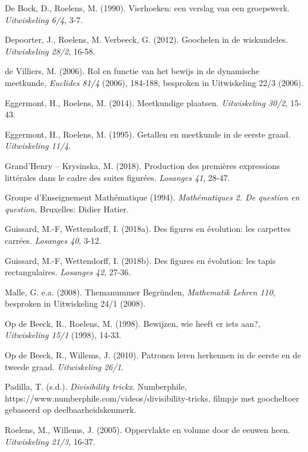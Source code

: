\stopcontents[mainsections]			        %


\begin{bronnen}

\item De Bock, D., Roelens, M. (1990). Vierhoeken: een verslag van een groepswerk. \emph{Uitwiskeling 6/4}, 3-7.
\item Depoorter, J., Roelens, M. Verbeeck, G. (2012). Goochelen in de wiskundeles. \emph{Uitwiskeling 28/2}, 16-58. \item de Villiers, M. (2006). Rol en functie van het bewijs in de dynamische meetkunde, \emph{Euclides 81/4} (2006), 184-188, besproken in Uitwiskeling 22/3 (2006).
\item Eggermont, H., Roelens, M. (2014). Meetkundige plaatsen. \emph{Uitwiskeling 30/2}, 15-43.
\item Eggermont, H., Roelens, M. (1995). Getallen en meetkunde in de eerste graad. \emph{Uitwiskeling 11/4}.
\item Grand’Henry – Krysinska, M. (2018). Production des premières expressions littérales dans le cadre des suites figurées. \emph{Losanges 41}, 28-47.
\item Groupe d’Enseignement Mathématique (1994). \emph{Mathématiques 2. De question en question.} Bruxelles: Didier Hatier.
\item Guissard, M.-F, Wettendorff, I. (2018a). Des figures en évolution: les carpettes carrées. \emph{Losanges 40}, 3-12.
\item Guissard, M.-F, Wettendorff, I. (2018b). Des figures en évolution: les tapis rectangulaires. \emph{Losanges 42}, 27-36.
\item Malle, G. e.a. (2008). Themanummer Begründen, \emph{Mathematik Lehren 110},  besproken in Uitwiskeling 24/1 (2008).
\item Op de Beeck, R., Roelens, M. (1998). Bewijzen, wie heeft er iets aan?, \emph{Uitwiskeling 15/1} (1998), 14-33.
\item Op de Beeck, R., Willems, J. (2010). Patronen leren herkennen in de eerste en de tweede graad. \emph{Uitwiskeling 26/1}.
\item Padilla, T. (s.d.). \emph{Divisibility trickx}. Numberphile, https://www.numberphile.com/videos/divisibility-tricks, filmpje met goocheltoer gebaseerd op deelbaarheidskenmerk.
\item Roelens, M., Willems, J. (2005). Oppervlakte en volume door de eeuwen heen. \emph{ Uitwiskeling 21/3}, 16-37.

\end{bronnen}
